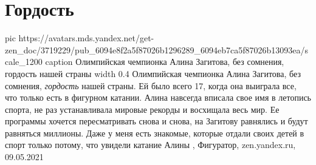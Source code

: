  
 
 
 
 
\chapter{Гордость}
\label{sec:slova.gordost}

\ifcmt
  pic https://avatars.mds.yandex.net/get-zen_doc/3719229/pub_6094e8f2a5f87026b1296289_6094eb7ca5f87026b13093ea/scale_1200
	caption Олимпийская чемпионка Алина Загитова, без сомнения, гордость нашей страны
	width 0.4
\fi
Олимпийская чемпионка Алина Загитова, без сомнения, \emph{гордость} нашей страны. Ей
было всего 17, когда она выиграла все, что только есть в фигурном катании.
Алина навсегда вписала свое имя в летопись спорта, не раз устанавливала мировые
рекорды и восхищала весь мир. Ее программы хочется пересматривать снова и
снова, на Загитову равнялись и будут равняться миллионы. Даже у меня есть
знакомые, которые отдали своих детей в спорт только потому, что увидели катание
Алины
, 
Фигуратор, zen.yandex.ru, 09.05.2021

